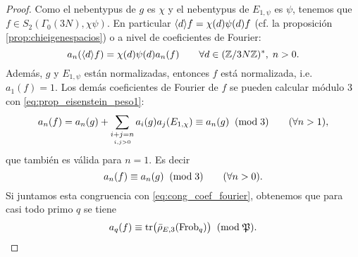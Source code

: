 \documentclass[../../tesis_maestria]{subfiles}
\begin{document}
\begin{proof}
    Como el nebentypus de $g$ es $\chi$ y el nebentypus de $E_{1,\psi}$ es $\psi$, tenemos que $f\in S_2(\Gamma_0(3N),\chi\psi)$. En particular $\langle d \rangle f=\chi(d)\psi(d)f$ (cf. la proposici\'on \ref{prop:chieigenespacios}) o a nivel de coeficientes de Fourier:
    \begin{equation}\label{eq:diamondf}
      a_n(\langle d \rangle f)=\chi(d)\psi(d)a_n(f)\qquad\forall d\in(\mathbb{Z}/3N\mathbb{Z})^*,\; n>0.
    \end{equation}
Además, $g$ y $E_{1,\psi}$ están normalizadas, entonces $f$ está normalizada, i.e. $a_1(f)=1$. Los dem\'as coeficientes de Fourier de $f$ se pueden calcular módulo 3 con \eqref{eq:prop_eisenstein_peso1}:
  \[
    a_n(f)=
    a_n(g)+\sum_{\underset{i,j>0}{i+j=n}}a_i(g)a_j(E_{1,\chi})\equiv
    a_n(g) \;\;(\mathrm{mod}\; 3)\qquad(\forall n>1),
  \]
que también es válida para $n=1$. Es decir
  \begin{equation}\label{eq:cong_coef_fourier_gE}
  	a_n(f)\equiv a_n(g) \;\;(\mathrm{mod}\; 3)\qquad(\forall n>0).
  \end{equation}
Si juntamos esta congruencia con \eqref{eq:cong_coef_fourier}, obtenemos que para casi todo primo $q$ se tiene
  \begin{equation}\label{eq:cong_coef_prod}
    a_q(f)\equiv\mathrm{tr}\big(\bar{\rho}_{E,3}(\mathrm{Frob}_q)\big) \;\;(\mathrm{mod}\; \mathfrak{P}).
  \end{equation}
  

\end{proof}
\end{document}
